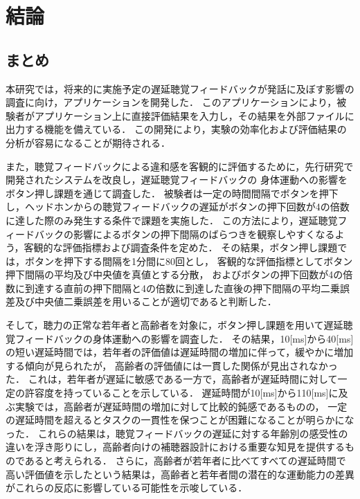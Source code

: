 \chapter{結論}
\section{まとめ}
本研究では，将来的に実施予定の遅延聴覚フィードバックが発話に及ぼす影響の調査に向け，アプリケーションを開発した．
このアプリケーションにより，被験者がアプリケーション上に直接評価結果を入力し，その結果を外部ファイルに出力する機能を備えている．
この開発により，実験の効率化および評価結果の分析が容易になることが期待される．

また，聴覚フィードバックによる違和感を客観的に評価するために，先行研究\cite{shigematu}で開発されたシステムを改良し，遅延聴覚フィードバックの
身体運動への影響をボタン押し課題を通じて調査した．
被験者は一定の時間間隔でボタンを押下し，ヘッドホンからの聴覚フィードバックの遅延がボタンの押下回数が4の倍数に達した際のみ発生する条件で課題を実施した．
この方法により，遅延聴覚フィードバックの影響によるボタンの押下間隔のばらつきを観察しやすくなるよう，客観的な評価指標および調査条件を定めた．
その結果，ボタン押し課題では，ボタンを押下する間隔を1分間に80回とし，
客観的な評価指標としてボタン押下間隔の平均及び中央値を真値とする分散，
およびボタンの押下回数が4の倍数に到達する直前の押下間隔と4の倍数に到達した直後の押下間隔の平均二乗誤差及び中央値二乗誤差を用いることが適切であると判断した．

そして，聴力の正常な若年者と高齢者を対象に，ボタン押し課題を用いて遅延聴覚フィードバックの身体運動への影響を調査した．
その結果，10[ms]から40[ms]の短い遅延時間では，若年者の評価値は遅延時間の増加に伴って，緩やかに増加する傾向が見られたが，
高齢者の評価値には一貫した関係が見出されなかった．
これは，若年者が遅延に敏感である一方で，高齢者が遅延時間に対して一定の許容度を持っていることを示している．
遅延時間が10[ms]から110[ms]に及ぶ実験では，高齢者が遅延時間の増加に対して比較的鈍感であるものの，
一定の遅延時間を超えるとタスクの一貫性を保つことが困難になることが明らかになった．
これらの結果は，聴覚フィードバックの遅延に対する年齢別の感受性の違いを浮き彫りにし，高齢者向けの補聴器設計における重要な知見を提供するものであると考えられる．
さらに，高齢者が若年者に比べてすべての遅延時間で高い評価値を示したという結果は，高齢者と若年者間の潜在的な運動能力の差異がこれらの反応に影響している可能性を示唆している．
